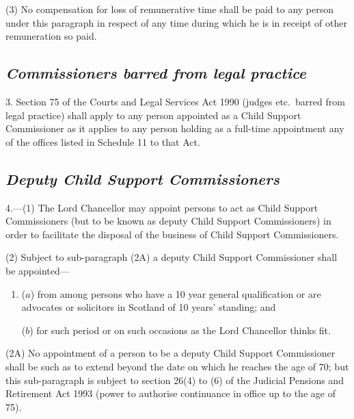 \documentclass[12pt,a4paper]{article}
\begin{document}
(3) No compensation for loss of remunerative time shall be paid to any person under this paragraph in respect of any time during which he is in receipt of other remuneration so paid.


\subsection*{\itshape Commissioners barred from legal practice}

3. Section 75 of the Courts and Legal Services Act 1990 (judges etc.\ barred from legal practice) shall apply to any person appointed as a Child Support Commissioner as it applies to any person holding as a full-time appointment any of the offices listed in Schedule 11 to that Act.

\subsection*{\itshape Deputy Child Support Commissioners}

4.---(1) The Lord Chancellor may appoint persons to act as Child Support Commissioners (but to be known as deputy Child Support Commissioners) in order to facilitate the disposal of the business of Child Support Commissioners.

(2) 
Subject to sub-paragraph (2A)  %
a deputy Child Support Commissioner shall be appointed—
\begin{enumerate}\item[]
($a$) from among persons who have a 10 year general qualification or are advocates or solicitors in Scotland of 10 years' standing; and

($b$) for such period or on such occasions as the Lord Chancellor thinks fit.
\end{enumerate}

(2A) No appointment of a person to be a deputy Child Support Commissioner shall be such as to extend beyond the date on which he reaches the age of 70; but this sub-paragraph is subject to section 26(4) to (6) of the Judicial Pensions and Retirement Act 1993 (power to authorise continuance in office up to the age of 75).
\end{document}
